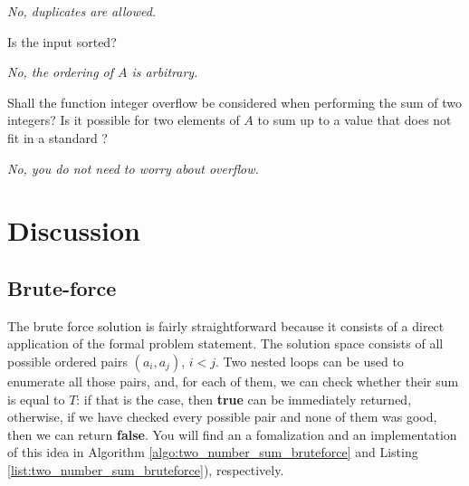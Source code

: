 \begin{QandA}
\begin{questionitem}
    \begin{answered}
		\textit{No, duplicates are allowed.}
	\end{answered} \end{questionitem}
	\item \begin{questionitem} \begin{question} Is the input sorted?  \end{question} 	 
    \begin{answered}
		\textit{No, the ordering of $A$ is arbitrary.}
	\end{answered} \end{questionitem}
	\item \begin{questionitem} \begin{question} Shall the function integer overflow be considered when performing the sum of two integers? Is it possible for two elements of $A$ to sum up to a value that does not fit in a standard ?  \end{question} 	 
    \begin{answered}
		\textit{No, you do not need to worry about overflow.}
	\end{answered} \end{questionitem}
\end{QandA}


\section{Discussion}

\subsection{Brute-force}
\label{sec:two_numbers:bruteforce}

The brute force solution is fairly straightforward because it consists of a direct application of the formal problem statement. 
The solution space consists of all possible ordered pairs $(a_i,a_j)$, $i < j$. 
Two nested loops can be used to enumerate all those pairs, and, for each of them, we can check whether their sum is equal to $T$: if that is the case,
then   \textbf{true} can be immediately returned, otherwise, if we have checked every possible pair and none of them was good, then we can return  \textbf{false}.
You will find an a fomalization and an implementation of this idea in Algorithm \ref{algo:two_number_sum_bruteforce}
and Listing \ref{list:two_number_sum_bruteforce}), respectively.

